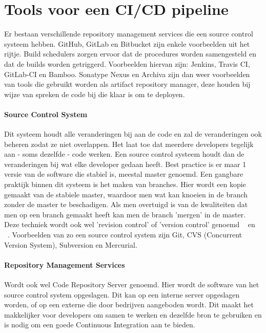 \section{Tools voor een CI/CD pipeline}
\label{sec:tools-voor-pipeline}
    Er bestaan verschillende repository management services die een source control systeem hebben. GitHub, GitLab en Bitbucket zijn enkele voorbeelden uit het rijtje.
    Build schedulers zorgen ervoor dat de procedures worden samengesteld en dat de builds worden getriggerd. Voorbeelden hiervan zijn: Jenkins, Travis CI, GitLab-CI en Bamboo. Sonatype Nexus en Archiva zijn dan weer voorbeelden van tools die gebruikt worden als artifact repository manager, deze houden bij wijze van spreken de code bij die klaar is om te deployen. 
    
    \paragraph{Source Control System}
    Dit systeem houdt alle veranderingen bij aan de code en zal de veranderingen ook beheren zodat ze niet overlappen. Het laat toe dat meerdere developers tegelijk aan - soms dezelfde - code werken. Een source control systeem houdt dan de veranderingen bij wat elke developer gedaan heeft. Best practice is er maar 1 versie van de software die stabiel is, meestal master genoemd. Een gangbare praktijk binnen dit systeem is het maken van branches. Hier wordt een kopie gemaakt van de stabiele master, waardoor men wat kan knoeien in de branch zonder de master te beschadigen. Als men overtuigd is van de kwaliteiten dat men op een branch gemaakt heeft kan men de branch 'mergen' in de master. Deze techniek wordt ook wel 'revision control' of 'version control' genoemd ~\autocite{Skelton2014} en ~\autocite{Riti2018}.
    Voorbeelden van zo een source control system zijn Git, CVS (Concurrent Version System), Subversion en Mercurial.
    
    \paragraph{Repository Management Services}
    Wordt ook wel Code Repository Server genoemd. Hier wordt de software van het source control system opgeslagen. Dit kan op een interne server opgeslagen worden, of op een externe die door bedrijven aangeboden wordt. Dit maakt het makkelijker voor developers om samen te werken en dezelfde bron te gebruiken en is nodig om een goede Continuous Integration aan te bieden.
    
